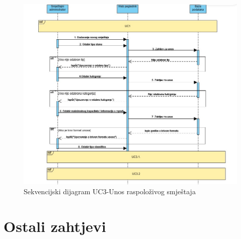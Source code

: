 				\begin{figure}[H]
					\includegraphics[width=\linewidth]{slike/DentAll-Sekvencijski-uc3-unos_raspoloživog_smještaja.jpg}
					\centering
					\caption{Sekvencijski dijagram UC3-Unos raspoloživog smještaja}
					\label{fig:Sekvencijski dijagram UC3}
				\end{figure}
				
				\eject
	
		\section{Ostali zahtjevi}
		
		 
